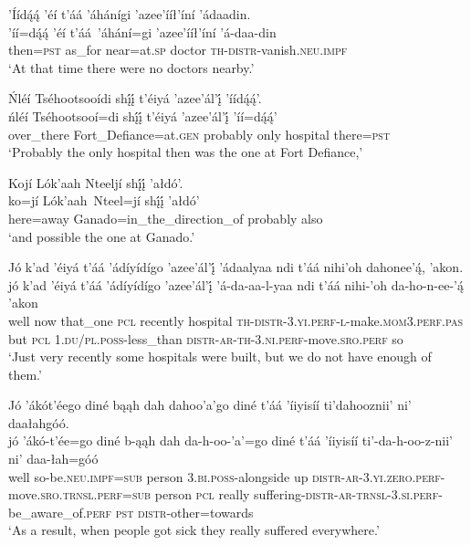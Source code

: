 \ea\label{ex:text6-16-12}
’Íídą́ą́ ’éí t’áá ’áhánígi ’azee’ííł’íní ’ádaadin.\\
\gll ’íí=dą́ą́	’éí	t’áá~{’áhání=gi}	’azee’ííł’íní	’á-daa-din\\
     then=\textsc{pst}	as\_for	near=at.\textsc{sp}	doctor	\textsc{th}-\textsc{distr}-vanish.\textsc{neu}.\textsc{impf}\\
\glt `At that time there were no doctors nearby.'
\z

\ea\label{ex:text6-16-13}
Ńléí Tséhootsooídi shį́į́ t’éiyá ’azee’ál’į́ ’íídą́ą́’.\\
\gll ńléí	Tséhootsooí=di	shį́į́	t’éiyá	’azee’ál’į́	’íí=dą́ą́’\\
     over\_there	Fort\_Defiance=at.\textsc{gen}	probably	only	hospital	there=\textsc{pst}\\
\glt `Probably the only hospital then was the one at Fort Defiance,'
\z

\ea\label{ex:text6-16-14}
Kojí Lók’aah Nteeljí shį́į́ ’ałdó’.\\
\gll ko=jí	Lók’aah~{Nteel=jí}	shį́į́	’ałdó’\\
     here=away	Ganado=in\_the\_direction\_of	probably	also\\
\glt `and possible the one at Ganado.'
\z

\ea\label{ex:text6-16-15}
Jó k’ad ’éiyá t’áá ’ádíyídígo ’azee’ál’į́ ’ádaalyaa ndi t’áá nihi’oh dahonee’ą́, ’akon.\\
\gll jó	k’ad	’éiyá	t’áá	’ádíyídígo	’azee’ál’į́	’á-da-aa-l-yaa	ndi	t’áá	nihi-’oh	da-ho-n-ee-’ą́	’akon\\
     well	now	that\_one	\textsc{pcl}	recently	hospital	\textsc{th}-\textsc{distr}-3.\textsc{yi}.\textsc{perf}-\textsc{l}-make.\textsc{mom}3.\textsc{perf}.\textsc{pas}	but	\textsc{pcl}	1.\textsc{du}/\textsc{pl}.\textsc{poss}-less\_than	\textsc{distr}-\textsc{ar}-\textsc{th}-3.\textsc{ni}.\textsc{perf}-move.\textsc{sro}.\textsc{perf}	so\\
\glt `Just very recently some hospitals were built, but we do not have enough of them.'
\z

\ea\label{ex:text6-16-16}
Jó ’ákót’éego diné bąąh dah dahoo’a’go diné t’áá ’íiyisíí ti’dahooznii’ ni’ daałahgóó.\\
\gll jó	’ákó-t’ée=go	diné	b-ąąh	dah	da-h-oo-’a’=go	diné	t’áá	’íiyisíí	ti’-da-h-oo-z-nii’	ni’	daa-łah=góó\\
     well	so-be.\textsc{neu}.\textsc{impf}=\textsc{sub}	person	3.\textsc{bi}.\textsc{poss}-alongside	up	\textsc{distr}-\textsc{ar}-3.\textsc{yi}.\textsc{zero}.\textsc{perf}-move.\textsc{sro}.\textsc{trnsl}.\textsc{perf}=\textsc{sub}	person	\textsc{pcl}	really	suffering-\textsc{distr}-\textsc{ar}-\textsc{trnsl}-3.\textsc{si}.\textsc{perf}-be\_aware\_of.\textsc{perf}	\textsc{pst}	\textsc{distr}-other=towards\\
\glt `As a result, when people got sick they really suffered everywhere.'
\z

